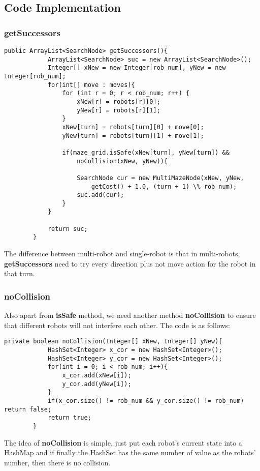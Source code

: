 \documentclass{article}
\begin{document}
\subsection{Code Implementation}
\subsubsection{getSuccessors}
\begin{lstlisting}
public ArrayList<SearchNode> getSuccessors(){
			ArrayList<SearchNode> suc = new ArrayList<SearchNode>();
			Integer[] xNew = new Integer[rob_num], yNew = new Integer[rob_num];
			for(int[] move : moves){
				for (int r = 0; r < rob_num; r++) {
					xNew[r] = robots[r][0];
					yNew[r] = robots[r][1];
				}
				xNew[turn] = robots[turn][0] + move[0];
				yNew[turn] = robots[turn][1] + move[1];
				
				if(maze_grid.isSafe(xNew[turn], yNew[turn]) && 
					noCollision(xNew, yNew)){

					SearchNode cur = new MultiMazeNode(xNew, yNew, 
						getCost() + 1.0, (turn + 1) \% rob_num);
					suc.add(cur);
				}
			}
			
			return suc;
		}
\end{lstlisting}

The difference between multi-robot and single-robot is that in multi-robots, \textbf{getSuccessors} need to try every direction plus not move action for the robot in that turn. 

\subsubsection{noCollision}
Also apart from \textbf{isSafe} method, we need another method \textbf{noCollision} to ensure that different robots will not interfere each other. The code is as follows:

\begin{lstlisting}
private boolean noCollision(Integer[] xNew, Integer[] yNew){
			HashSet<Integer> x_cor = new HashSet<Integer>();
			HashSet<Integer> y_cor = new HashSet<Integer>();
			for(int i = 0; i < rob_num; i++){
				x_cor.add(xNew[i]);
				y_cor.add(yNew[i]);
			}
			if(x_cor.size() != rob_num && y_cor.size() != rob_num) return false;
			return true;
		}
\end{lstlisting}
The idea of \textbf{noCollision} is simple, just put each robot's current state into a HashMap and if finally the HashSet has the same number of value as the robots' number, then there is no collision.
\end{document}
